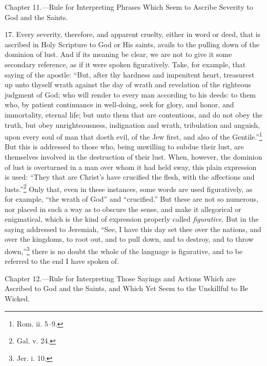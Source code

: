 Chapter 11.—Rule for Interpreting Phrases Which Seem to Ascribe Severity to God and the Saints.

17. Every severity, therefore, and apparent cruelty, either in word or deed, that is ascribed in Holy Scripture to God or His saints, avails to the pulling down of the dominion of lust. And if its meaning be clear, we are not to give it some secondary reference, as if it were spoken figuratively. Take, for example, that saying of the apostle: “But, after thy hardness and impenitent heart, treasurest up unto thyself wrath against the day of wrath and revelation of the righteous judgment of God; who will render to every man according to his deeds: to them who, by patient continuance in well-doing, seek for glory, and honor, and immortality, eternal life; but unto them that are contentious, and do not obey the truth, but obey unrighteousness, indignation and wrath, tribulation and anguish, upon every soul of man that doeth evil, of the Jew first, and also of the Gentile.”\footnote{Rom. ii. 5–9.} But this is addressed to those who, being unwilling to subdue their lust, are themselves involved in the destruction of their lust. When, however, the dominion of lust is overturned in a man over whom it had held sway, this plain expression is used: “They that are Christ’s have crucified the flesh, with the affections and lusts.”\footnote{Gal. v. 24.} Only that, even in these instances, some words are used figuratively, as for example, “the wrath of God” and “crucified.” But these are not so numerous, nor placed in such a way as to obscure the sense, and make it allegorical or enigmatical, which is the kind of expression properly called \emph{figurative}. But in the saying addressed to Jeremiah, “See, I have this day set thee over the nations, and over the kingdoms, to root out, and to pull down, and to destroy, and to throw down,”\footnote{Jer. i. 10.} there is no doubt the whole of the language is figurative, and to be referred to the end I have spoken of.


Chapter 12.—Rule for Interpreting Those Sayings and Actions Which are Ascribed to God and the Saints, and Which Yet Seem to the Unskillful to Be Wicked.

